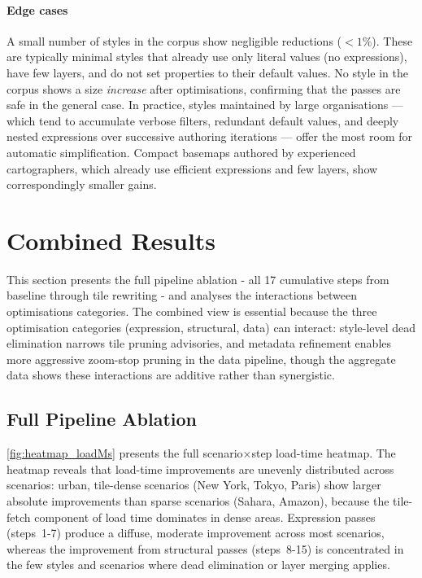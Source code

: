\paragraph{Edge cases}
A small number of styles in the corpus show negligible reductions ($< 1\%$).
These are typically minimal styles that already use only literal values (no expressions), have few layers, and do not set properties to their default values.
No style in the corpus shows a size \emph{increase} after optimisations, confirming that the passes are safe in the general case.
In practice, styles maintained by large organisations --- which tend to accumulate verbose filters, redundant default values, and deeply nested expressions over successive authoring iterations --- offer the most room for automatic simplification.
Compact basemaps authored by experienced cartographers, which already use efficient expressions and few layers, show correspondingly smaller gains.


\section{Combined Results}\label{sec_exp_combined}

This section presents the full pipeline ablation - all 17 cumulative steps from baseline through tile rewriting - and analyses the interactions between optimisations categories.
The combined view is essential because the three optimisation categories (expression, structural, data) can interact: style-level dead elimination narrows tile pruning advisories, and metadata refinement enables more aggressive zoom-stop pruning in the data pipeline, though the aggregate data shows these interactions are additive rather than synergistic.

\subsection{Full Pipeline Ablation}\label{sub_combined_ablation}

\cref{fig:heatmap_loadMs} presents the full scenario$\times$step load-time heatmap.
The heatmap reveals that load-time improvements are unevenly distributed across scenarios: urban, tile-dense scenarios (New York, Tokyo, Paris) show larger absolute improvements than sparse scenarios (Sahara, Amazon), because the tile-fetch component of load time dominates in dense areas.
Expression passes (steps~1-7) produce a diffuse, moderate improvement across most scenarios, whereas the improvement from structural passes (steps~8-15) is concentrated in the few styles and scenarios where dead elimination or layer merging applies.

